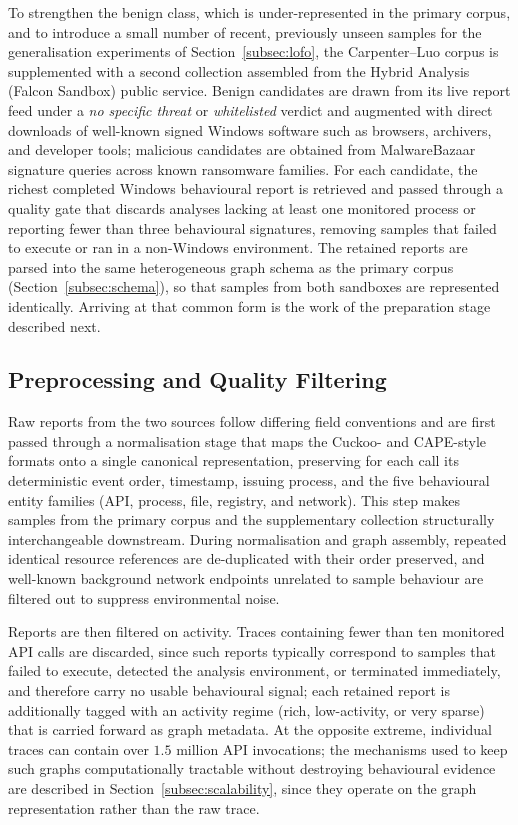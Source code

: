 \documentclass[%
    BCOR=10mm,
    DIV=13,
    toc=bibliography,
    toc=listof,
    oneside,
    12pt,
]{scrbook}
\begin{document}
To strengthen the benign class, which is under-represented in the primary
corpus, and to introduce a small number of recent, previously unseen samples
for the generalisation experiments of Section~\ref{subsec:lofo}, the
Carpenter--Luo corpus is supplemented with a second collection assembled from
the Hybrid Analysis (Falcon Sandbox) public service. Benign candidates are
drawn from its live report feed under a \emph{no specific threat} or
\emph{whitelisted} verdict and augmented with direct downloads of well-known
signed Windows software such as browsers, archivers, and developer tools;
malicious candidates are obtained from MalwareBazaar signature queries across
known ransomware families. For each candidate, the richest completed Windows
behavioural report is retrieved and passed through a quality gate that
discards analyses lacking at least one monitored process or reporting fewer
than three behavioural signatures, removing samples that failed to execute or
ran in a non-Windows environment. The retained reports are parsed into the
same heterogeneous graph schema as the primary corpus
(Section~\ref{subsec:schema}), so that samples from both sandboxes are
represented identically. Arriving at that common form is the work of the
preparation stage described next.

\subsection{Preprocessing and Quality Filtering}
\label{subsec:preprocessing}

Raw reports from the two sources follow differing field conventions and are
first passed through a normalisation stage that maps the Cuckoo- and CAPE-style
formats onto a single canonical representation, preserving for each call its
deterministic event order, timestamp, issuing process, and the five
behavioural entity families (API, process, file, registry, and network). This step makes samples from the primary corpus and
the supplementary collection structurally interchangeable downstream. During
normalisation and graph assembly, repeated identical resource references are
de-duplicated with their order preserved, and well-known background network
endpoints unrelated to sample behaviour are filtered out to suppress
environmental noise.

Reports are then filtered on activity. Traces containing fewer than ten
monitored API calls are discarded, since such reports typically correspond to
samples that failed to execute, detected the analysis environment, or
terminated immediately, and therefore carry no usable behavioural signal; each
retained report is additionally tagged with an activity regime (rich,
low-activity, or very sparse) that is carried forward as graph metadata. At the opposite extreme,
individual traces can contain over $1.5$ million API invocations; the
mechanisms used to keep such graphs computationally tractable without
destroying behavioural evidence are described in
Section~\ref{subsec:scalability}, since they operate on the graph
representation rather than the raw trace.
\end{document}
